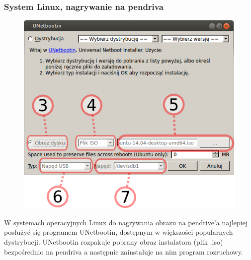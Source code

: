 \subsubsection{System Linux, nagrywanie na pendriva}
\begin{figure}
	\vspace{-10pt}
	\includegraphics[width=\linewidth]{images/instalacja_nagrywanie_obrazu_linux.png}
\end{figure}

W systemach operacyjnych Linux do nagrywania obrazu na pendrive'a najlepiej posłużyć się programem \textcolor{ubuntu_orange}{UNetbootin}, dostępnym w większości popularnych dystrybucji. UNetbootin rozpakuje pobrany obraz instalatora (plik .iso) bezpośrednio na pendriva a następnie zainstaluje na nim program rozruchowy.

